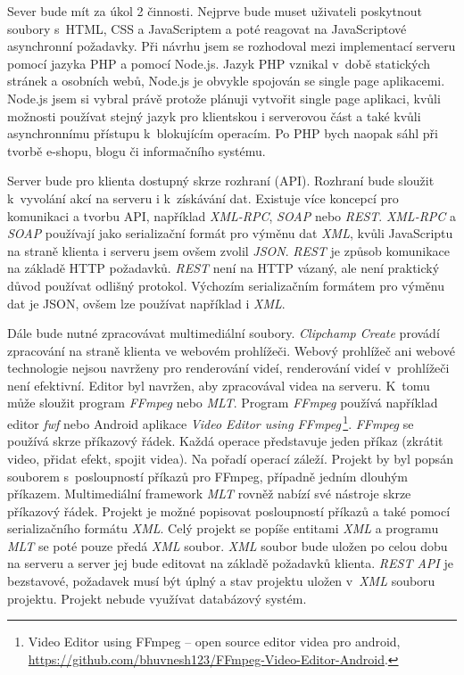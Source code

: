 Sever bude mít za úkol 2 činnosti. Nejprve bude muset uživateli poskytnout soubory s~HTML, CSS a JavaScriptem a poté reagovat na JavaScriptové asynchronní požadavky. Při návrhu jsem se rozhodoval mezi implementací serveru pomocí jazyka PHP a pomocí Node.js. Jazyk PHP vznikal v~době statických stránek a osobních webů, Node.js je obvykle spojován se single page aplikacemi. Node.js jsem si vybral právě protože plánuji vytvořit single page aplikaci, kvůli možnosti používat stejný jazyk pro klientskou i serverovou část a také kvůli asynchronnímu přístupu k~blokujícím operacím. Po PHP bych naopak sáhl při tvorbě e-shopu, blogu či informačního systému.

Server bude pro klienta dostupný skrze rozhraní (API). Rozhraní bude sloužit k~vyvolání akcí na serveru i k~získávání dat. Existuje více koncepcí pro komunikaci a tvorbu API, například \textit{XML-RPC}, \textit{SOAP} nebo \textit{REST}. \textit{XML-RPC} a \textit{SOAP} používají jako serializační formát pro výměnu dat \textit{XML}, kvůli JavaScriptu na straně klienta i serveru jsem ovšem zvolil \textit{JSON}. \textit{REST} je způsob komunikace na základě HTTP požadavků. \textit{REST} není na HTTP vázaný, ale není praktický důvod používat odlišný protokol. Výchozím serializačním formátem pro výměnu dat je JSON, ovšem lze používat například i \textit{XML}.

Dále bude nutné zpracovávat multimediální soubory. \textit{Clipchamp Create} provádí zpracování na straně klienta ve webovém prohlížeči. Webový prohlížeč ani webové technologie nejsou navrženy pro renderování videí, renderování videí v~prohlížeči není efektivní. Editor byl navržen, aby zpracovával videa na serveru. K~tomu může sloužit program \textit{FFmpeg} nebo \textit{MLT}. Program \textit{FFmpeg} používá například editor \textit{fwf} nebo Android aplikace \textit{Video Editor using FFmpeg}\,\footnote{Video Editor using FFmpeg -- open source editor videa pro android, \url{https://github.com/bhuvnesh123/FFmpeg-Video-Editor-Android}.}. \textit{FFmpeg} se používá skrze příkazový řádek. Každá operace představuje jeden příkaz (zkrátit video, přidat efekt, spojit videa). Na pořadí operací záleží. Projekt by byl popsán souborem s~posloupností příkazů pro FFmpeg, případně jedním dlouhým příkazem. Multimediální framework \textit{MLT} rovněž nabízí své nástroje skrze příkazový řádek. Projekt je možné popisovat posloupností příkazů a také pomocí serializačního formátu \textit{XML}. Celý projekt se popíše entitami \textit{XML} a programu \textit{MLT} se poté pouze předá \textit{XML} soubor. \textit{XML} soubor bude uložen po celou dobu na serveru a server jej bude editovat na základě požadavků klienta. \textit{REST API} je bezstavové, požadavek musí být úplný a stav projektu uložen v~\textit{XML} souboru projektu. Projekt nebude využívat databázový systém.

